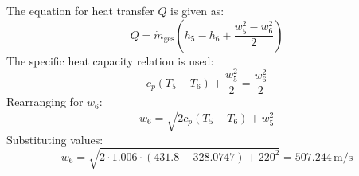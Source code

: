 The equation for heat transfer \( Q \) is given as:  
\[
Q = \dot{m}_{\text{ges}} \left( h_5 - h_6 + \frac{w_5^2 - w_6^2}{2} \right)
\]
The specific heat capacity relation is used:  
\[
c_p (T_5 - T_6) + \frac{w_5^2}{2} = \frac{w_6^2}{2}
\]
Rearranging for \( w_6 \):  
\[
w_6 = \sqrt{2 c_p (T_5 - T_6) + w_5^2}
\]
Substituting values:  
\[
w_6 = \sqrt{2 \cdot 1.006 \cdot (431.8 - 328.0747) + 220^2} = 507.244 \, \text{m/s}
\]